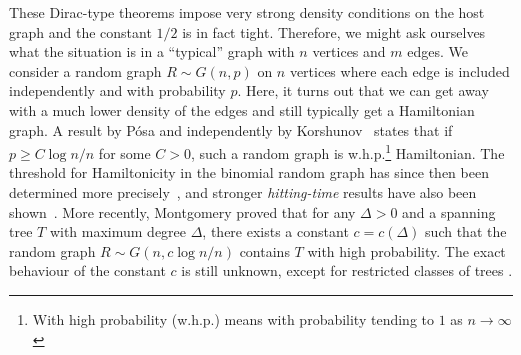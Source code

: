 \documentclass[10pt, a4paper]{article}
\theoremstyle{remark}
\begin{document}
These Dirac-type theorems impose very strong density conditions on the host graph and the constant $1/2$ is in fact tight.
Therefore, we might ask ourselves what the situation is in a ``typical'' graph with $n$ vertices and $m$ edges.
We consider a random graph $R \sim G(n, p)$ on $n$ vertices where each edge is included independently and with probability $p$.
Here, it turns out that we can get away with a much lower density of the edges and still typically get a Hamiltonian graph.
A result by P\'osa \cite{posa_hamiltonian_1976} and independently by Korshunov~\cite{korshunov1976solution} states that if $p \geq C\log n / n$ for some $C>0$, such a random graph is w.h.p.\footnote{With high probability (w.h.p.) means with probability tending to $1$ as $n \rightarrow \infty$} Hamiltonian. The threshold for Hamiltonicity  in the binomial random graph has since then been determined more precisely~\cite{komlos1983limit}, and stronger \emph{hitting-time} results have also been shown~\cite{ajtai1985first,bollobas1984evolution}.
More recently, Montgomery \cite{montgomery2014embedding,montgomery_spanning_2019} proved that for any $\Delta > 0$ and a spanning tree $T$ with maximum degree $\Delta$, there exists a constant $c = c(\Delta)$ such that the random graph $R \sim G(n, c\log n / n)$ contains $T$ with high probability.
The exact behaviour of the constant $c$  is still unknown, except for restricted classes of trees \cite{hefetz_spanning_threshold, montgomery2014sharp}.
\end{document}

